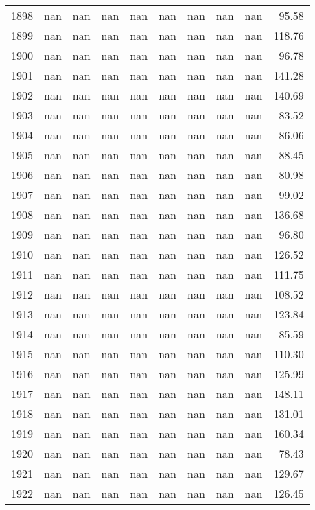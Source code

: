 \begin{tabular}{lrrrrrrrrr}
1898 & nan & nan & nan & nan & nan & nan & nan & nan & 95.58 \\
1899 & nan & nan & nan & nan & nan & nan & nan & nan & 118.76 \\
1900 & nan & nan & nan & nan & nan & nan & nan & nan & 96.78 \\
1901 & nan & nan & nan & nan & nan & nan & nan & nan & 141.28 \\
1902 & nan & nan & nan & nan & nan & nan & nan & nan & 140.69 \\
1903 & nan & nan & nan & nan & nan & nan & nan & nan & 83.52 \\
1904 & nan & nan & nan & nan & nan & nan & nan & nan & 86.06 \\
1905 & nan & nan & nan & nan & nan & nan & nan & nan & 88.45 \\
1906 & nan & nan & nan & nan & nan & nan & nan & nan & 80.98 \\
1907 & nan & nan & nan & nan & nan & nan & nan & nan & 99.02 \\
1908 & nan & nan & nan & nan & nan & nan & nan & nan & 136.68 \\
1909 & nan & nan & nan & nan & nan & nan & nan & nan & 96.80 \\
1910 & nan & nan & nan & nan & nan & nan & nan & nan & 126.52 \\
1911 & nan & nan & nan & nan & nan & nan & nan & nan & 111.75 \\
1912 & nan & nan & nan & nan & nan & nan & nan & nan & 108.52 \\
1913 & nan & nan & nan & nan & nan & nan & nan & nan & 123.84 \\
1914 & nan & nan & nan & nan & nan & nan & nan & nan & 85.59 \\
1915 & nan & nan & nan & nan & nan & nan & nan & nan & 110.30 \\
1916 & nan & nan & nan & nan & nan & nan & nan & nan & 125.99 \\
1917 & nan & nan & nan & nan & nan & nan & nan & nan & 148.11 \\
1918 & nan & nan & nan & nan & nan & nan & nan & nan & 131.01 \\
1919 & nan & nan & nan & nan & nan & nan & nan & nan & 160.34 \\
1920 & nan & nan & nan & nan & nan & nan & nan & nan & 78.43 \\
1921 & nan & nan & nan & nan & nan & nan & nan & nan & 129.67 \\
1922 & nan & nan & nan & nan & nan & nan & nan & nan & 126.45 \\

\end{tabular}
